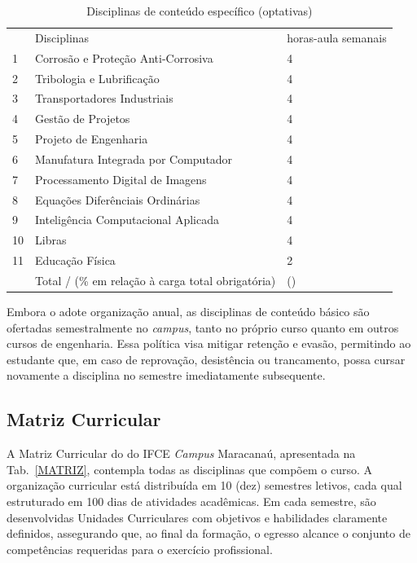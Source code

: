 \begin{destacar}
\begin{longtable}{|p{0.8cm}|p{7.5cm}|p{2.0cm}|}
	\caption{Disciplinas de conteúdo específico (optativas)}\label{tab7} 
	\vspace{-0.25cm}
	\\ \hline 
	\cellcolor{\cinza} & \cellcolor{\cinza}Disciplinas & \cellcolor{\cinza}horas-aula semanais  \\ 
	\hline
	1 &  Corrosão e Proteção Anti-Corrosiva  &  4 \\ \hline
	2 &  Tribologia e Lubrificação  &  4 \\ \hline
	3 &  Transportadores Industriais  &  4 \\ \hline
	4 &  Gestão de Projetos  &  4 \\ \hline
	5 &  Projeto de Engenharia  &  4 \\ \hline
	6 &  Manufatura Integrada por Computador  &  4 \\ \hline
	7 &  Processamento Digital de Imagens  &  4 \\ \hline
	8 &  Equações Diferênciais Ordinárias  &  4 \\ \hline
	9 &  Inteligência Computacional Aplicada  &  4 \\ \hline
	10 &  Libras  &  4 \\ \hline
	11 &  Educação Física  &  2 \\ \hline
	&  Total / (\% em relação à carga total obrigatória)  &  \CHOPTCR(\CHOPTPEMIN) \\ \hline
\end{longtable}

\end{destacar}

Embora o \NOMECURSO adote organização anual, as disciplinas de conteúdo básico são ofertadas semestralmente no \textit{campus}, tanto no próprio curso quanto em outros cursos de engenharia. Essa política visa mitigar retenção e evasão, permitindo ao estudante que, em caso de reprovação, desistência ou trancamento, possa cursar novamente a disciplina no semestre imediatamente subsequente.


\subsection{Matriz Curricular}

A Matriz Curricular do \NOMECURSO do IFCE \textit{Campus} Maracanaú, apresentada na Tab.~\ref{MATRIZ}, contempla todas as disciplinas que compõem o curso. A organização curricular está distribuída em 10 (dez) semestres letivos, cada qual estruturado em 100 dias de atividades acadêmicas. Em cada semestre, são desenvolvidas Unidades Curriculares com objetivos e habilidades claramente definidos, assegurando que, ao final da formação, o egresso alcance o conjunto de competências requeridas para o exercício profissional.


